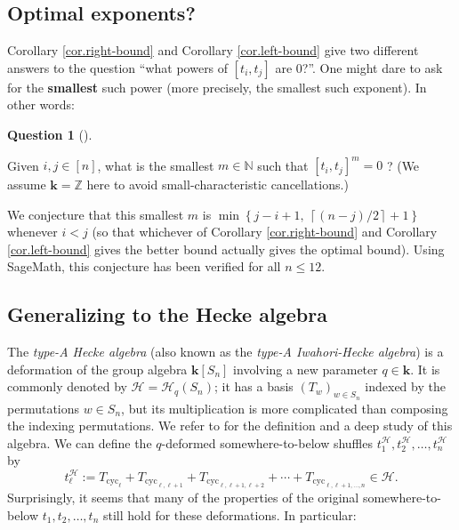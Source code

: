 \documentclass[numbers=enddot,12pt,final,onecolumn,notitlepage]{scrartcl}%
\theoremstyle{definition}
\newtheorem{quest}[theo]{Question}
\newenvironment{question}[1][]
{\begin{quest}[#1]\begin{leftbar}}
{\end{leftbar}\end{quest}}
\newenvironment{question}[1][Question]{\noindent\textbf{#1.} }{\ \rule{0.5em}{0.5em}}
\begin{document}
\subsection{\label{subsec.further.opti}Optimal exponents?}

Corollary \ref{cor.right-bound} and Corollary \ref{cor.left-bound} give two
different answers to the question \textquotedblleft what powers of $\left[
t_{i},t_{j}\right]  $ are $0$?\textquotedblright. One might dare to ask for
the \textbf{smallest} such power (more precisely, the smallest such exponent).
In other words:

\begin{question}
Given $i,j\in\left[  n\right]  $, what is the smallest $m\in\mathbb{N}$ such
that $\left[  t_{i},t_{j}\right]  ^{m}=0$ ? (We assume $\mathbf{k}=\mathbb{Z}$
here to avoid small-characteristic cancellations.)
\end{question}

We conjecture that this smallest $m$ is $\min\left\{  j-i+1,\ \left\lceil
\left(  n-j\right)  /2\right\rceil +1\right\}  $ whenever $i<j$ (so that
whichever of Corollary \ref{cor.right-bound} and Corollary
\ref{cor.left-bound} gives the better bound actually gives the optimal bound).
Using SageMath, this conjecture has been verified for all $n\leq12$.

\subsection{Generalizing to the Hecke algebra}

The \emph{type-A Hecke algebra} (also known as the \emph{type-A Iwahori-Hecke
algebra}) is a deformation of the group algebra $\mathbf{k}\left[
S_{n}\right]  $ involving a new parameter $q\in\mathbf{k}$. It is commonly
denoted by $\mathcal{H}=\mathcal{H}_{q}\left(  S_{n}\right)  $; it has a basis
$\left(  T_{w}\right)  _{w\in S_{n}}$ indexed by the permutations $w\in S_{n}%
$, but its multiplication is more complicated than composing the indexing
permutations. We refer to \cite{Mathas99} for the definition and a deep study
of this algebra. We can define the $q$-deformed somewhere-to-below shuffles
$t_{1}^{\mathcal{H}},t_{2}^{\mathcal{H}},\ldots,t_{n}^{\mathcal{H}}$ by%
\[
t_{\ell}^{\mathcal{H}}:=T_{\operatorname*{cyc}\nolimits_{\ell}}%
+T_{\operatorname*{cyc}\nolimits_{\ell,\ell+1}}+T_{\operatorname*{cyc}%
\nolimits_{\ell,\ell+1,\ell+2}}+\cdots+T_{\operatorname*{cyc}\nolimits_{\ell
,\ell+1,\ldots,n}}\in\mathcal{H}.
\]
Surprisingly, it seems that many of the properties of the original
somewhere-to-below $t_{1},t_{2},\ldots,t_{n}$ still hold for these
deformations. In particular:
\end{document}
